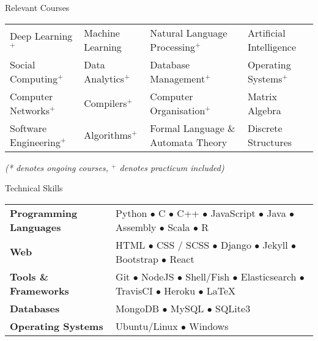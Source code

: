 \documentclass{resume} %
\begin{document}

\begin{rSection}{Relevant Courses}

\begin{center}
\begin{tabular}{p{3.9cm} p{3.0cm} p{6.5cm} p{4.0cm}}
  Deep Learning$^+$ & Machine Learning & Natural Language Processing$^+$ & Artificial Intelligence\\
  Social Computing$^+$ & Data Analytics$^+$ & Database Management$^+$ & Operating Systems$^+$\\
  Computer Networks$^+$ & Compilers$^+$ & Computer Organisation$^+$ & Matrix Algebra\\
  Software Engineering$^+$ & Algorithms$^+$ & Formal Language \& Automata Theory & Discrete Structures\\
\end{tabular}
\footnotesize \textit{(* denotes ongoing courses, $^+$ denotes practicum included)}
\end{center}
\end{rSection}


\begin{rSection}{Technical Skills}

\begin{tabular}{ @{} >{\bfseries}l @{\hspace{6ex}} l }
Programming Languages & Python $\bullet$ C $\bullet$ C++ $\bullet$ JavaScript $\bullet$ Java $\bullet$ Assembly $\bullet$ Scala $\bullet$ R \\
Web & HTML $\bullet$ CSS / SCSS $\bullet$ Django $\bullet$ Jekyll $\bullet$ Bootstrap $\bullet$ React \\
Tools \& Frameworks & Git $\bullet$ NodeJS $\bullet$ Shell/Fish $\bullet$ Elasticsearch $\bullet$ TravisCI $\bullet$ Heroku $\bullet$ \LaTeX \\
Databases & MongoDB $\bullet$ MySQL $\bullet$ SQLite3 \\
Operating Systems & Ubuntu/Linux $\bullet$ Windows
\end{tabular}

\end{rSection}
\end{document}
